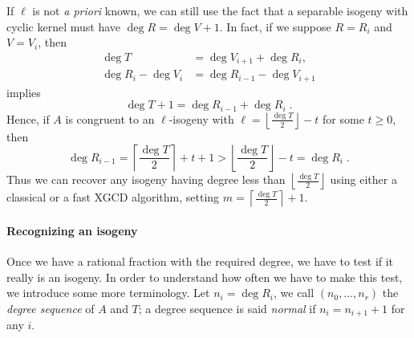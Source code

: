 If $\ell$ is not \emph{a priori} known, we can still use the fact that
a separable isogeny with cyclic kernel must have $\deg R = \deg V +
1$. In fact, if we suppose $R = R_i$ and $V = V_i$, then
\begin{align*}
  \deg T &= \deg V_{i+1} + \deg R_i,\\
  \deg R_i - \deg V_i &= \deg R_{i-1} - \deg V_{i+1}
\end{align*}
implies
\begin{equation*}
  \deg T + 1 = \deg R_{i-1} + \deg R_i  
  \;\text{.}
\end{equation*}
Hence, if $A$ is congruent to an $\ell$-isogeny with $\ell =
\left\lfloor\frac{\deg T}{2}\right\rfloor - t$ for some $t\ge0$, then
\begin{equation}
  \label{eq:degseq}
  \deg R_{i-1} =
  \left\lceil\frac{\deg T}{2}\right\rceil + t + 1 >
  \left\lfloor\frac{\deg T}{2}\right\rfloor - t = \deg R_i
  \;\text{.}
\end{equation}
Thus we can recover any isogeny having degree less than
$\left\lfloor\frac{\deg T}{2}\right\rfloor$ using either a classical
or a fast XGCD algorithm, setting $m = \left\lceil\frac{\deg
    T}{2}\right\rceil + 1$.


\paragraph{Recognizing an isogeny}
Once we have a rational fraction with the required degree, we have to
test if it really is an isogeny. In order to understand how often we
have to make this test, we introduce some more terminology. Let $n_i =
\deg R_i$, we call $(n_0,\ldots,n_r)$ the \emph{degree sequence} of
$A$ and $T$; a degree sequence is said \emph{normal} if $n_i = n_{i+1}
+ 1$ for any $i$.

